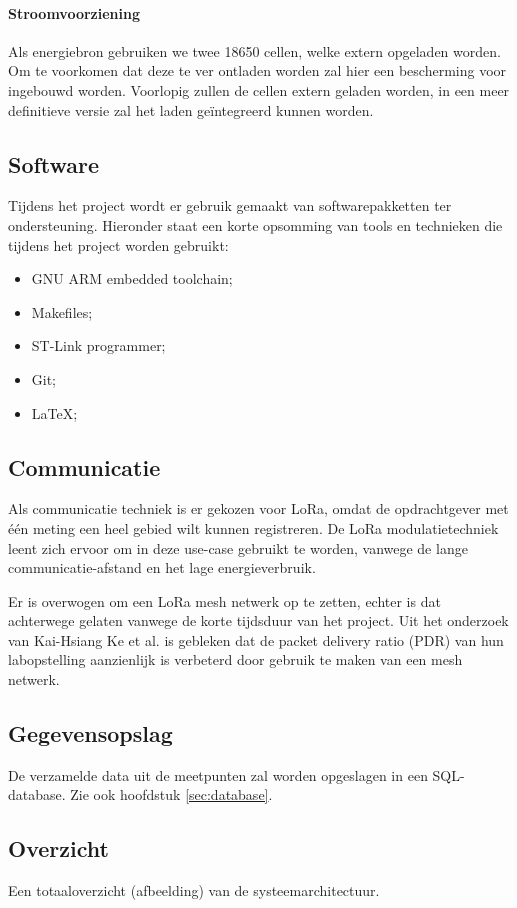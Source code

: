 \paragraph{Stroomvoorziening}
Als energiebron gebruiken we twee 18650 cellen, welke extern opgeladen worden.
Om te voorkomen dat deze te ver ontladen worden zal hier een bescherming voor
ingebouwd worden. Voorlopig zullen de cellen extern geladen worden, in een meer
definitieve versie zal het laden geïntegreerd kunnen worden.

\subsection{Software}
Tijdens het project wordt er gebruik gemaakt van softwarepakketten ter ondersteuning. Hieronder staat een korte opsomming van tools en technieken die tijdens het project worden gebruikt:
\begin{itemize}
    \item GNU ARM embedded toolchain;
    \item Makefiles;
    \item ST-Link programmer;
    \item Git;
    \item \LaTeX;
\end{itemize}

\subsection{Communicatie}
Als communicatie techniek is er gekozen voor LoRa, omdat de opdrachtgever met één meting een heel gebied wilt kunnen registreren. De LoRa modulatietechniek leent zich ervoor om in deze use-case gebruikt te worden, vanwege de lange communicatie-afstand en het lage energieverbruik.

Er is overwogen om een LoRa mesh netwerk op te zetten, echter is dat achterwege gelaten vanwege de korte tijdsduur van het project. Uit het onderzoek van Kai-Hsiang Ke et al. is gebleken dat de packet delivery ratio (PDR) van hun labopstelling aanzienlijk is verbeterd door gebruik te maken van een mesh netwerk.

\subsection{Gegevensopslag}
De verzamelde data uit de meetpunten zal worden opgeslagen in een SQL-database.
Zie ook hoofdstuk \ref{sec:database}.

\label{subsec:overzicht}
\subsection{Overzicht}
Een totaaloverzicht (afbeelding) van de systeemarchitectuur.
